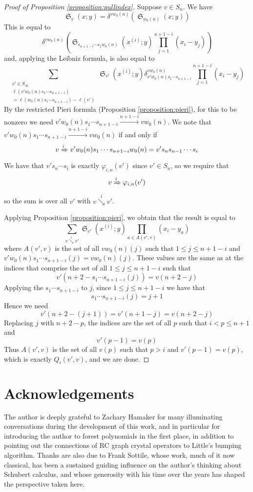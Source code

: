 \documentclass[a4paper,fleqn]{cas-sc}
\theoremstyle{definition}
\theoremstyle{remark}
\numberwithin{equation}{subsection}
\DeclareMathOperator{\sch}{\mathfrak{S}}
\newcommand{\downvar}[1]{\stackrel{#1}{\searrow}}
\newcommand{\tom}[1]{\xrightarrow{#1}}
\newcommand{\Tom}[1]{\xRightarrow{#1}}
\newcommand{\ddv}[1]{\delta}
\begin{document}
\begin{proof}[Proof of Proposition \ref{proposition:pullindex}]
Suppose $v\in S_n$. We have
$$\sch_v(x;y)=\ddv{y}^{vw_0(n)}(\sch_{w_0(n)}(x;y))$$
This is equal to
$$\ddv{y}^{vw_0(n)}\left(\sch_{s_{n+1-i}\cdots s_1w_0(n)}(x^{(i)};y)\prod_{j=1}^{n+1-i}(x_i - y_j)\right)$$
and, applying the Leibniz formula, is also equal to
$$\sum_{\substack{v'\in S_\infty\\\ell(v'w_0(n)s_1\cdots s_{n+1-i})\\=\ell(w_0(n)s_1\cdots s_{n+1-i})-\ell(v')}}\sch_{v'}(x^{(i)};y)\ddv{y}_{v'w_0(n)s_1\cdots s_{n+1-i}}^{vw_0(n)}\prod_{j=1}^{n+1-i}(x_i - y_j)$$
By the restricted Pieri formula (Proposition \ref{proposition:pieri}), for this to be nonzero we need $v'w_0(n)s_1\cdots s_{n+1-i}\allowbreak\tom{n+1-i}vw_0(n)$. We note that $v'w_0(n)s_1\cdots s_{n+1-i}\tom{n+1-i}vw_0(n)$ if and only if 
$$v\Tom{i}v'w_0(n)s_1\cdots s_{n+1-i}w_0(n)=v's_ns_{n-1}\cdots s_i$$
We have that $v's_n\cdots s_i$ is exactly $\varphi_{i,n}(v')$ since $v'\in S_n$, so we require that
$$v\Tom{i}\varphi_{i,n}(v')$$
so the sum is over all $v'$ with $v\downvar{i} v'$.

Applying Proposition \ref{proposition:pieri}, we obtain that the result is equal to
$$\sum_{v\downvar{i} v'} \sch_{v'}(x^{(i)};y)\prod_{a\in A(v',v)}(x_i - y_a)$$
where $A(v',v)$ is the set of all $vw_0(n)(j)$ such that $1\leq j\leq n+1-i$ and $v'w_0(n)s_1\cdots s_{n+1-i}(j)=vw_0(n)(j)$. These values are the same as at the indices that comprise the set of all $1\leq j\leq n+1-i$ such that
$$v'(n+2-s_1\cdots s_{n+1-i}(j))=v(n+2-j)$$
Applying the $s_1\cdots s_{n+1-i}$ to $j$, since $1\leq j\leq n+1-i$ we have that 
$$s_1\cdots s_{n+1-i}(j)=j+1$$
Hence we need
$$v'(n+2-(j+1))=v'(n+1-j)=v(n+2-j)$$
Replacing $j$ with $n+2-p$, the indices are the set of all $p$ such that $i<p\leq n+1$ and
$$v'(p-1)=v(p)$$
Thus $A(v',v)$ is the set of all $v(p)$ such that $p>i$ and $v'(p-1)=v(p)$, which is exactly $Q_i(v',v)$, and we are done.
\end{proof}

\section*{Acknowledgements}

The author is deeply grateful to Zachary Hamaker for many illuminating conversations during the development of this work, and in particular for introducing the author to forest polynomials in the first place, in addition to pointing out the connections of RC graph crystal operators to  Little's bumping algorithm. Thanks are also due to Frank Sottile, whose work, much of it now classical, has been a sustained guiding influence on the author's thinking about Schubert calculus, and whose generosity with his time over the years has shaped the perspective taken here.



\end{document}
